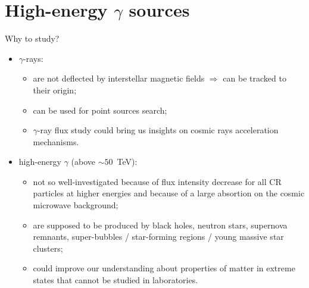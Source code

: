 
\begin{frame}
\titlepage
\end{frame}

\section{High-energy \texorpdfstring{$\gamma$}{gamma} sources}

\begin{frame}{Why to study?}
  \begin{itemize}
    \item $\gamma$-rays:
    \begin{itemize}
        \item are not deflected by interstellar magnetic fields $\Rightarrow$ can be tracked to their origin;
        \item can be used for point sources search;
        \item $\gamma$-ray flux study could bring us insights on cosmic rays acceleration mechanisms.
    \end{itemize}
    \item high-energy $\gamma$ (above $\sim50$~TeV):
    \begin{itemize}
        \item not so well-investigated because of flux intensity decrease for all CR particles at higher energies and because of a large absortion on the cosmic microwave background;
        \item are supposed to be produced by black holes, neutron stars, supernova remnants, super-bubbles / star-forming regions / young massive star clusters;
        \item could improve our understanding about properties of matter in extreme states that cannot be studied in laboratories.
    \end{itemize}
  \end{itemize}
\end{frame}
